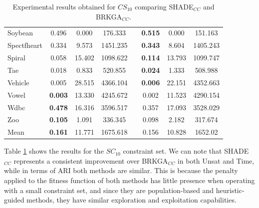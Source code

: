 \documentclass[review]{elsarticle}
\begin{document}
\begin{table}[!h]
{\begin{tabular}{l ccc c ccc}
			Soybean & 0.496 & 0.000 & 176.333 && \textbf{0.515} & 0.000 & 151.163 \\
			Spectfheart & 0.334 & 9.573 & 1451.235 && \textbf{0.343} & 8.604 & 1405.243 \\
			Spiral & 0.058 & 15.402 & 1098.622 && \textbf{0.114} & 13.793 & 1099.747 \\
			Tae & 0.018 & 0.833 & 520.855 && \textbf{0.024} & 1.333 & 508.988 \\
			Vehicle & 0.005 & 28.515 & 4366.104 && \textbf{0.006} & 22.151 & 4352.663 \\
			Vowel & \textbf{0.003} & 13.330 & 4245.672 && 0.002 & 11.523 & 4290.154 \\
			Wdbc & \textbf{0.478} & 16.316 & 3596.517 && 0.357 & 17.093 & 3528.029 \\
			Zoo & \textbf{0.105} & 1.091 & 336.345 && 0.098 & 2.182 & 317.674 \\
			\hline
			Mean & \textbf{0.161} & 11.771 & 1675.618 && 0.156 & 10.828 & 1652.02 \\
			\hline

		\end{tabular}}

	\caption{Experimental results obtained for $CS_{10}$ comparing SHADE$_{CC}$ and BRKGA$_{CC}$.}
	\label{tab:results10}
\end{table}

Table \ref{tab:results10} shows the results for the $SC_{10}$ constraint set. We can note that SHADE$_{CC}$ represents a consistent improvement over BRKGA$_{CC}$ in both Unsat and Time, while in terms of ARI both methods are similar. This is because the penalty applied to the fitness function of both methods has little presence when operating with a small constraint set, and since they are population-based and heuristic-guided methods, they have similar exploration and exploitation capabilities.
\end{document}
